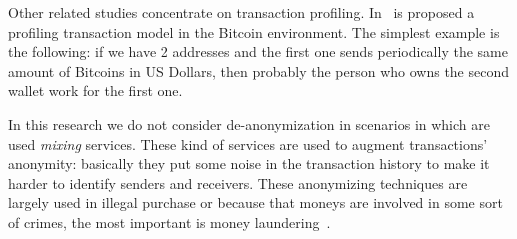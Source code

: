 Other related studies concentrate on transaction profiling.
In~\cite{bib:fullDiscl} is
proposed a profiling transaction model in the Bitcoin environment. The
simplest example is the following: if we have 2 addresses and the first one
sends periodically the same amount of Bitcoins in US Dollars, then probably
the person who owns the second wallet work for the first one.

In this research we do not consider de-anonymization in scenarios in which are
used \textit{mixing} services. These kind of services are used to augment
transactions' anonymity: basically they put some noise in the transaction
history to make it harder to identify senders and receivers.
These anonymizing techniques are largely used in illegal purchase or because
that moneys are involved in some sort of crimes, the most important is money
laundering~\cite{bib:laundering}.
